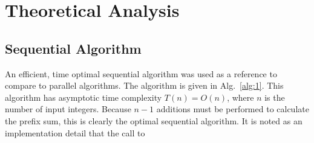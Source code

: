 \documentclass[12pt]{article}
\begin{document}
\section{Theoretical Analysis}

\subsection{Sequential Algorithm}

An efficient, time optimal sequential algorithm was used as a reference to
compare to parallel algorithms.  The algorithm is given in Alg.~\ref{alg:1}.
This algorithm has asymptotic time complexity $T(n)=O(n)$, where $n$ is the number of
input integers. Because $n-1$ additions must be performed to calculate the prefix sum,
this is clearly the optimal sequential algorithm. It is noted as an implementation detail that the call to
\end{document}
